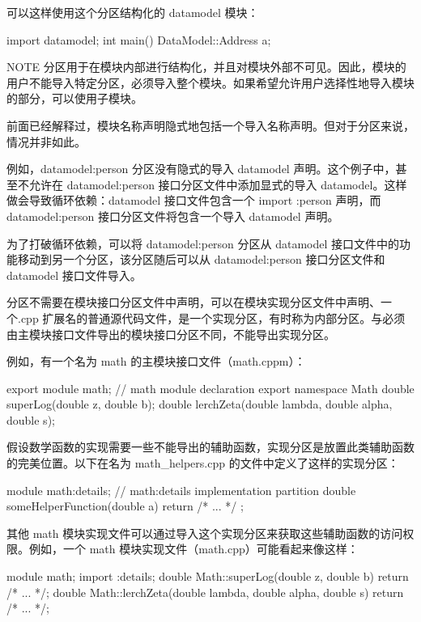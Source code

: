 可以这样使用这个分区结构化的 datamodel 模块：

\begin{cpp}
import datamodel;
int main() { DataModel::Address a; }
\end{cpp}

\begin{myNotic}{NOTE}
分区用于在模块内部进行结构化，并且对模块外部不可见。因此，模块的用户不能导入特定分区，必须导入整个模块。如果希望允许用户选择性地导入模块的部分，可以使用子模块。
\end{myNotic}

前面已经解释过，模块名称声明隐式地包括一个导入名称声明。但对于分区来说，情况并非如此。

例如，datamodel:person 分区没有隐式的导入 datamodel 声明。这个例子中，甚至不允许在 datamodel:person 接口分区文件中添加显式的导入 datamodel。这样做会导致循环依赖：datamodel 接口文件包含一个 import :person 声明，而 datamodel:person 接口分区文件将包含一个导入 datamodel 声明。

为了打破循环依赖，可以将 datamodel:person 分区从 datamodel 接口文件中的功能移动到另一个分区，该分区随后可以从 datamodel:person 接口分区文件和 datamodel 接口文件导入。


分区不需要在模块接口分区文件中声明，可以在模块实现分区文件中声明、一个.cpp 扩展名的普通源代码文件，是一个实现分区，有时称为内部分区。与必须由主模块接口文件导出的模块接口分区不同，不能导出实现分区。

例如，有一个名为 math 的主模块接口文件（math.cppm）：

\begin{cpp}
export module math; // math module declaration
export namespace Math
{
    double superLog(double z, double b);
    double lerchZeta(double lambda, double alpha, double s);
}
\end{cpp}

假设数学函数的实现需要一些不能导出的辅助函数，实现分区是放置此类辅助函数的完美位置。以下在名为 math\_helpers.cpp 的文件中定义了这样的实现分区：

\begin{cpp}
module math:details; // math:details implementation partition
double someHelperFunction(double a) { return /* ... */ ; }
\end{cpp}

其他 math 模块实现文件可以通过导入这个实现分区来获取这些辅助函数的访问权限。例如，一个 math 模块实现文件（math.cpp）可能看起来像这样：

\begin{cpp}
module math;
import :details;
double Math::superLog(double z, double b) { return /* ... */; }
double Math::lerchZeta(double lambda, double alpha, double s) { return /* ... */; }
\end{cpp}

